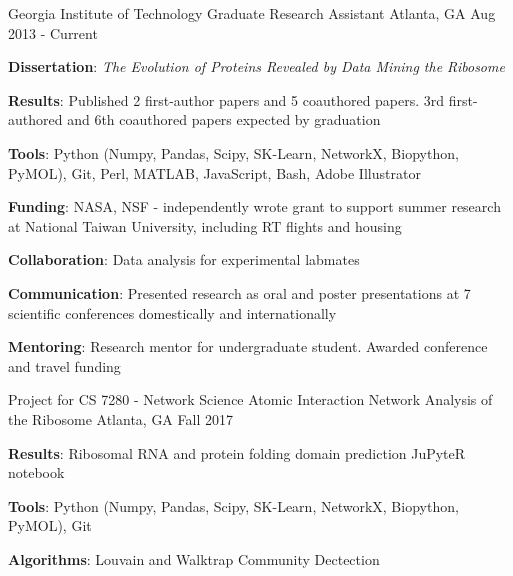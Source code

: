 

\begin{cventries}

  \cventry
    {Georgia Institute of Technology} %
    {Graduate Research Assistant} %
    {Atlanta, GA} %
    {Aug 2013 - Current} %
    {{\textbf{Dissertation}: \textit{The Evolution of Proteins Revealed by Data Mining the Ribosome}}
      \begin{cvitems} %
      \vspace{4.0mm}
        \item {\textbf{Results}: Published 2 first-author papers and 5 coauthored papers. 3rd first-authored and 6th coauthored papers expected by graduation}
        \item {\textbf{Tools}: Python {\scriptsize(Numpy, Pandas, Scipy, SK-Learn, NetworkX, Biopython, PyMOL)}, Git, Perl, MATLAB, JavaScript, Bash, Adobe Illustrator}
        \item {\textbf{Funding}: NASA, NSF - independently wrote grant to support summer research at National Taiwan University, including RT flights and housing}
        \item {\textbf{Collaboration}: Data analysis for experimental labmates}
        \item {\textbf{Communication}: Presented research as oral and poster presentations at 7 scientific conferences domestically and internationally}
        \item {\textbf{Mentoring}: Research mentor for undergraduate student. Awarded conference and travel funding} 
      \end{cvitems}
    }

  \cventry
    {Project for CS 7280 - Network Science} %
    {Atomic Interaction Network Analysis of the Ribosome} %
    {Atlanta, GA} %
    {Fall 2017} %
    {
      \begin{cvitems} %
      	\item {\textbf{Results}: Ribosomal RNA and protein folding domain prediction JuPyteR notebook}
        \item {\textbf{Tools}: Python {\tiny(Numpy, Pandas, Scipy, SK-Learn, NetworkX, Biopython, PyMOL)}}, Git
        \item {\textbf{Algorithms}: Louvain and Walktrap Community Dectection}
      \end{cvitems}
    }


\end{cventries}
